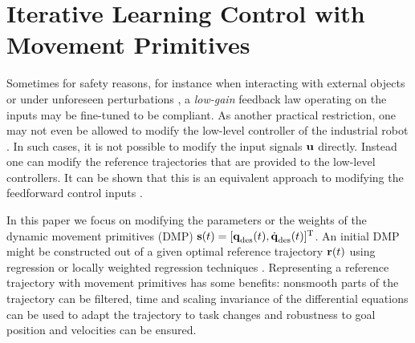 \section{Iterative Learning Control with Movement Primitives}\label{method}

Sometimes for safety reasons, for instance when interacting with external objects or under unforeseen perturbations \cite{Schaal07}, a \emph{low-gain} feedback law operating on the inputs may be fine-tuned to be compliant. As another practical restriction, one may not even be allowed to modify the low-level controller of the industrial robot \cite{Longman2000}. In such cases, it is not possible to modify the input signals $\boldsymbol{\mathrm{u}}$ directly. Instead one can modify the reference trajectories that are provided to the low-level controllers. It can be shown that this is an equivalent approach to modifying the feedforward control inputs \cite{Bristow06}.

In this paper we focus on modifying the parameters or the weights of the dynamic movement primitives (DMP) $\boldsymbol{\mathrm{s}}(t) = [\boldsymbol{\mathrm{q}}_{\text{des}}(t),\dot{\boldsymbol{\mathrm{q}}}_{\text{des}}(t)]^{\mathrm{T}}$. An initial DMP might be constructed out of a given optimal reference trajectory $\boldsymbol{\mathrm{r}}(t)$ using regression or locally weighted regression techniques \cite{Ijspeert13}. Representing a reference trajectory with movement primitives has some benefits: nonsmooth parts of the trajectory can be filtered, time and scaling invariance of the differential equations can be used to adapt the trajectory to task changes and robustness to goal position and velocities can be ensured.

